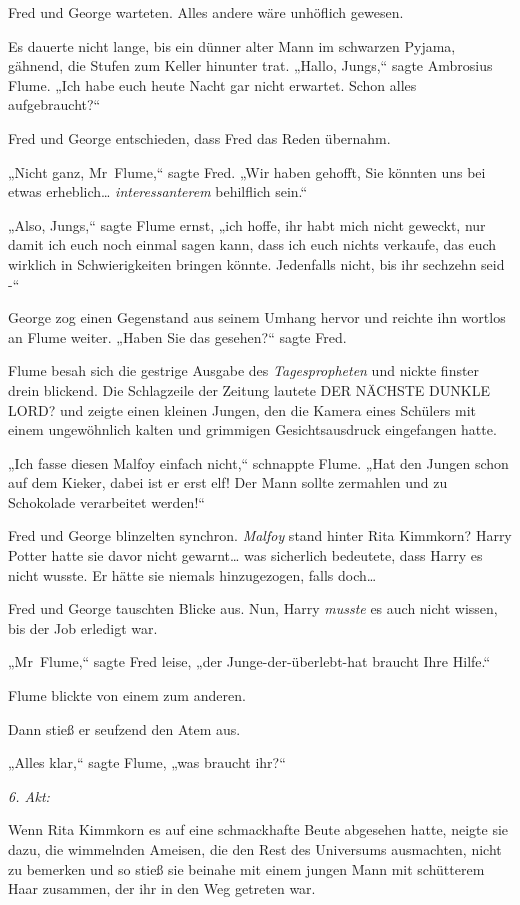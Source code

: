 {Fred und George warteten. Alles andere wäre unhöflich gewesen.

Es dauerte nicht lange, bis ein dünner alter Mann im schwarzen Pyjama, gähnend, die Stufen zum Keller hinunter trat. „Hallo, Jungs,“ sagte Ambrosius Flume. „Ich habe euch heute Nacht gar nicht erwartet. Schon alles aufgebraucht?“

Fred und George entschieden, dass Fred das Reden übernahm.

„Nicht ganz, Mr~Flume,“ sagte Fred. „Wir haben gehofft, Sie könnten uns bei etwas erheblich… \emph{interessanterem} behilflich sein.“

„Also, Jungs,“ sagte Flume ernst, „ich hoffe, ihr habt mich nicht geweckt, nur damit ich euch noch einmal sagen kann, dass ich euch nichts verkaufe, das euch wirklich in Schwierigkeiten bringen könnte. Jedenfalls nicht, bis ihr sechzehn seid -“

George zog einen Gegenstand aus seinem Umhang hervor und reichte ihn wortlos an Flume weiter. „Haben Sie das gesehen?“ sagte Fred.

Flume besah sich die gestrige Ausgabe des \emph{Tagespropheten} und nickte finster drein blickend. Die Schlagzeile der Zeitung lautete DER NÄCHSTE DUNKLE LORD? und zeigte einen kleinen Jungen, den die Kamera eines Schülers mit einem ungewöhnlich kalten und grimmigen Gesichtsausdruck eingefangen hatte.

„Ich fasse diesen Malfoy einfach nicht,“ schnappte Flume. „Hat den Jungen schon auf dem Kieker, dabei ist er erst elf! Der Mann sollte zermahlen und zu Schokolade verarbeitet werden!“

Fred und George blinzelten synchron. \emph{Malfoy} stand hinter Rita Kimmkorn? Harry Potter hatte sie davor nicht gewarnt… was sicherlich bedeutete, dass Harry es nicht wusste. Er hätte sie niemals hinzugezogen, falls doch…

Fred und George tauschten Blicke aus. Nun, Harry \emph{musste} es auch nicht wissen, bis der Job erledigt war.

„Mr~Flume,“ sagte Fred leise, „der Junge-der-überlebt-hat braucht Ihre Hilfe.“

Flume blickte von einem zum anderen.

Dann stieß er seufzend den Atem aus.

„Alles klar,“ sagte Flume, „was braucht ihr?“

\later

\emph{6. Akt:}

Wenn Rita Kimmkorn es auf eine schmackhafte Beute abgesehen hatte, neigte sie dazu, die wimmelnden Ameisen, die den Rest des Universums ausmachten, nicht zu bemerken und so stieß sie beinahe mit einem jungen Mann mit schütterem Haar zusammen, der ihr in den Weg getreten war.

}

